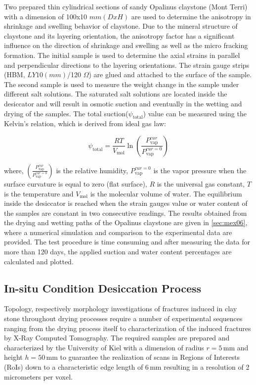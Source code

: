 Two prepared thin cylindrical sections of sandy Opalinus claystone (Mont Terri) with a dimension of 100x10 $mm (DxH)$ are used to determine the anisotropy in shrinkage and swelling behavior of claystone. Due to the mineral structure of claystone and its layering orientation, the anisotropy factor has a significant influence on the direction of shrinkage and swelling as well as the micro fracking formation. The initial sample is used to determine the axial strains in parallel and perpendicular directions to the layering orientations. The strain gauge strips (HBM, $LY 10 (mm)$/120 $\Omega$) are glued and attached to the surface of the sample. The second sample is used to measure the weight change in the sample under different salt solutions. The saturated salt solutions are located inside the desiccator and will result in osmotic suction and eventually in the wetting and drying of the samples. The total suction($\psi_\text{total}$) value can be measured using the Kelvin’s relation, which is derived from ideal gas law:

\begin{equation}
\label{eq:Total_Suction}
\psi_\text{total} = \frac{RT}{V_\text{mol}} \ln(\frac{P_\text{vap}^{cur}}{P_\text{vap}^{cur=0}})
\end{equation}

where, $(\frac{P_\text{vap}^{cur}}{P_\text{vap}^{cur=0}})$ is the relative humidity, $P_\text{vap}^{cur=0}$ is the vapor pressure when the surface curvature is equal to zero (flat surface), $R$ is the universal gas constant, $T$ is the temperature and $V_\text{mol}$ is the molecular volume of water. The equilibrium inside the desiccator is reached when the strain gauges value or water content of the samples are constant in two consecutive readings. The results obtained from the drying and wetting paths of the Opalinus claystone are given in \ref{sec:mex06}, where a numerical simulation and comparison to the experimental data are provided. The test procedure is time consuming and after measuring the data for more than 120 days, the applied suction and water content percentages are calculated and plotted. 

\subsection{In-situ Condition Desiccation Process}

Topology, respectively morphology investigations of fractures induced in clay stone throughout drying processes require a number of experimental sequences ranging from the drying process itself to characterization of the induced fractures by X-Ray Computed Tomography. The required samples are prepared and characterized by the University of Kiel with a dimension of radius $r=5 \, \text{mm}$ and height $h=50 \, \text{mm}$ to guarantee the realization of scans in Regions of Interests (RoIs) down to a characteristic edge length of $6 \, \text{mm}$ resulting in a resolution of 2 micrometers per voxel.

